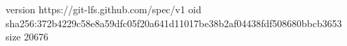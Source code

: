 version https://git-lfs.github.com/spec/v1
oid sha256:372b4229c58e8a59dfc05f20a641d11017be38b2af04438fdf508680bbcb3653
size 20676
